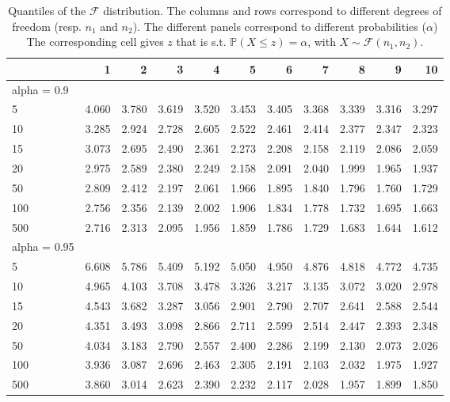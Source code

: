 \documentclass[
  11pt,
]{book}
\theoremstyle{definition}
\theoremstyle{definition}
\theoremstyle{definition}
\theoremstyle{definition}
\theoremstyle{remark}
\begin{document}
\begin{table}

\caption{\label{tab:Fstat}Quantiles of the $\mathcal{F}$ distribution. The columns and rows correspond to different degrees of freedom (resp. $n_1$ and $n_2$). The different panels correspond to different probabilities ($\alpha$) The corresponding cell gives $z$ that is s.t. $\mathbb{P}(X \le z)=\alpha$, with $X \sim \mathcal{F}(n_1,n_2)$.}
\centering
\begin{tabular}[t]{l|r|r|r|r|r|r|r|r|r|r}
\hline
  & 1 & 2 & 3 & 4 & 5 & 6 & 7 & 8 & 9 & 10\\
\hline
alpha = 0.9 &  &  &  &  &  &  &  &  &  & \\
\hline
5 & 4.060 & 3.780 & 3.619 & 3.520 & 3.453 & 3.405 & 3.368 & 3.339 & 3.316 & 3.297\\
\hline
10 & 3.285 & 2.924 & 2.728 & 2.605 & 2.522 & 2.461 & 2.414 & 2.377 & 2.347 & 2.323\\
\hline
15 & 3.073 & 2.695 & 2.490 & 2.361 & 2.273 & 2.208 & 2.158 & 2.119 & 2.086 & 2.059\\
\hline
20 & 2.975 & 2.589 & 2.380 & 2.249 & 2.158 & 2.091 & 2.040 & 1.999 & 1.965 & 1.937\\
\hline
50 & 2.809 & 2.412 & 2.197 & 2.061 & 1.966 & 1.895 & 1.840 & 1.796 & 1.760 & 1.729\\
\hline
100 & 2.756 & 2.356 & 2.139 & 2.002 & 1.906 & 1.834 & 1.778 & 1.732 & 1.695 & 1.663\\
\hline
500 & 2.716 & 2.313 & 2.095 & 1.956 & 1.859 & 1.786 & 1.729 & 1.683 & 1.644 & 1.612\\
\hline
alpha = 0.95 &  &  &  &  &  &  &  &  &  & \\
\hline
5 & 6.608 & 5.786 & 5.409 & 5.192 & 5.050 & 4.950 & 4.876 & 4.818 & 4.772 & 4.735\\
\hline
10 & 4.965 & 4.103 & 3.708 & 3.478 & 3.326 & 3.217 & 3.135 & 3.072 & 3.020 & 2.978\\
\hline
15 & 4.543 & 3.682 & 3.287 & 3.056 & 2.901 & 2.790 & 2.707 & 2.641 & 2.588 & 2.544\\
\hline
20 & 4.351 & 3.493 & 3.098 & 2.866 & 2.711 & 2.599 & 2.514 & 2.447 & 2.393 & 2.348\\
\hline
50 & 4.034 & 3.183 & 2.790 & 2.557 & 2.400 & 2.286 & 2.199 & 2.130 & 2.073 & 2.026\\
\hline
100 & 3.936 & 3.087 & 2.696 & 2.463 & 2.305 & 2.191 & 2.103 & 2.032 & 1.975 & 1.927\\
\hline
500 & 3.860 & 3.014 & 2.623 & 2.390 & 2.232 & 2.117 & 2.028 & 1.957 & 1.899 & 1.850\\

\end{tabular}
\end{table}
\end{document}
